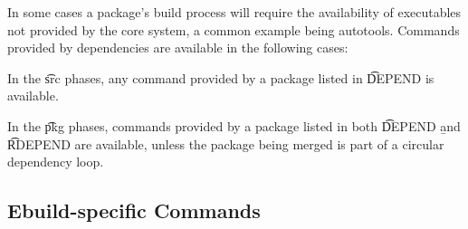 In some cases a package's build process will require the availability of executables not provided by
the core system, a common example being autotools. Commands provided by dependencies are available
in the following cases:
\begin{bulletlist}
\item In the \t{src} phases, any command provided by a package listed in \t{DEPEND} is available.
\item In the \t{pkg} phases, commands provided by a package listed in both \t{DEPEND} \b{and} \t{RDEPEND} are
    available, unless the package being merged is part of a circular dependency loop.
\end{bulletlist}

\subsection{Ebuild-specific Commands}


